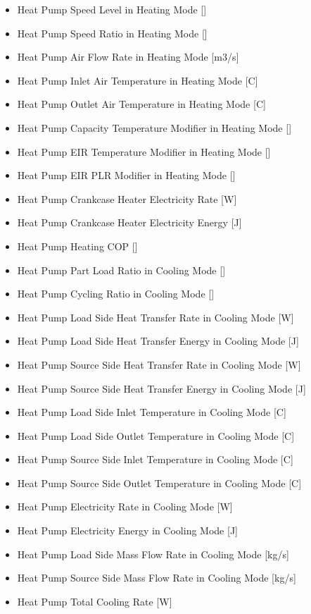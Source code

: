 \begin{itemize}
\item Heat Pump Speed Level in Heating Mode {[}{]}
\item Heat Pump Speed Ratio in Heating Mode {[}{]}
\item Heat Pump Air Flow Rate in Heating Mode {[}m3/s{]}
\item Heat Pump Inlet Air Temperature in Heating Mode {[}C{]}
\item Heat Pump Outlet Air Temperature in Heating Mode {[}C{]}
\item Heat Pump Capacity Temperature Modifier in Heating Mode {[}{]}
\item Heat Pump EIR Temperature Modifier in Heating Mode {[}{]}
\item Heat Pump EIR PLR Modifier in Heating Mode {[}{]}
\item Heat Pump Crankcase Heater Electricity Rate {[}W{]}
\item Heat Pump Crankcase Heater Electricity Energy {[}J{]}
\item Heat Pump Heating COP {[}{]}
\item Heat Pump Part Load Ratio in Cooling Mode {[}{]}
\item Heat Pump Cycling Ratio in Cooling Mode {[}{]}
\item Heat Pump Load Side Heat Transfer Rate in Cooling Mode {[}W{]}
\item Heat Pump Load Side Heat Transfer Energy in Cooling Mode {[}J{]}
\item Heat Pump Source Side Heat Transfer Rate in Cooling Mode {[}W{]}
\item Heat Pump Source Side Heat Transfer Energy in Cooling Mode {[}J{]}
\item Heat Pump Load Side Inlet Temperature in Cooling Mode {[}C{]}
\item Heat Pump Load Side Outlet Temperature in Cooling Mode {[}C{]}
\item Heat Pump Source Side Inlet Temperature in Cooling Mode {[}C{]}
\item Heat Pump Source Side Outlet Temperature in Cooling Mode {[}C{]}
\item Heat Pump Electricity Rate in Cooling Mode {[}W{]}
\item Heat Pump Electricity Energy in Cooling Mode {[}J{]}
\item Heat Pump Load Side Mass Flow Rate in Cooling Mode {[}kg/s{]}
\item Heat Pump Source Side Mass Flow Rate in Cooling Mode {[}kg/s{]}
\item Heat Pump Total Cooling Rate {[}W{]}

\end{itemize}
